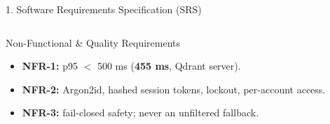 \documentclass[aspectratio=169, 11pt]{beamer}
\begin{document}
\begin{frame}{1. Software Requirements Specification (SRS)}
\begin{columns}[T]
\begin{block}{Non-Functional \& Quality Requirements}
            \scriptsize
            \begin{itemize}
                \item \textbf{NFR-1:} p95 $<$ 500 ms (\textbf{455 ms}, Qdrant server).
                \item \textbf{NFR-2:} Argon2id, hashed session tokens, lockout, per-account access.
                \item \textbf{NFR-3:} fail-closed safety; never an unfiltered fallback.
            \end{itemize}
        \end{block}
    \end{columns}
\end{frame}

\end{document}

